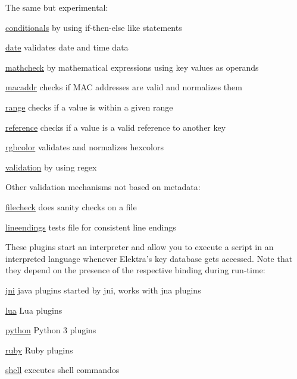 The same but experimental\+:


\begin{DoxyItemize}
\item \hyperlink{autotoc_md84_src_plugins_conditionals_README_md}{conditionals} by using if-\/then-\/else like statements
\item \hyperlink{autotoc_md147_src_plugins_date_README_md}{date} validates date and time data
\item \hyperlink{autotoc_md368_src_plugins_mathcheck_README_md}{mathcheck} by mathematical expressions using key values as operands
\item \hyperlink{autotoc_md364_src_plugins_macaddr_README_md}{macaddr} checks if M\+AC addresses are valid and normalizes them
\item \hyperlink{autotoc_md533_src_plugins_range_README_md}{range} checks if a value is within a given range
\item \hyperlink{autotoc_md557_src_plugins_reference_README_md}{reference} checks if a value is a valid reference to another key
\item \hyperlink{autotoc_md589_src_plugins_rgbcolor_README_md}{rgbcolor} validates and normalizes hexcolors
\item \hyperlink{autotoc_md760_src_plugins_validation_README_md}{validation} by using regex
\end{DoxyItemize}

Other validation mechanisms not based on metadata\+:


\begin{DoxyItemize}
\item \hyperlink{autotoc_md226_src_plugins_filecheck_README_md}{filecheck} does sanity checks on a file
\item \hyperlink{autotoc_md351_src_plugins_lineendings_README_md}{lineendings} tests file for consistent line endings
\end{DoxyItemize}

These plugins start an interpreter and allow you to execute a script in an interpreted language whenever Elektra’s key database gets accessed. Note that they depend on the presence of the respective binding during run-\/time\+:


\begin{DoxyItemize}
\item \hyperlink{autotoc_md305_src_plugins_jni_README_md}{jni} java plugins started by jni, works with jna plugins
\item \hyperlink{autotoc_md359_src_plugins_lua_README_md}{lua} Lua plugins
\item \hyperlink{autotoc_md504_src_plugins_python_README_md}{python} Python 3 plugins
\item \hyperlink{autotoc_md592_src_plugins_ruby_README_md}{ruby} Ruby plugins
\item \hyperlink{autotoc_md597_src_plugins_shell_README_md}{shell} executes shell commandos
\end{DoxyItemize}


